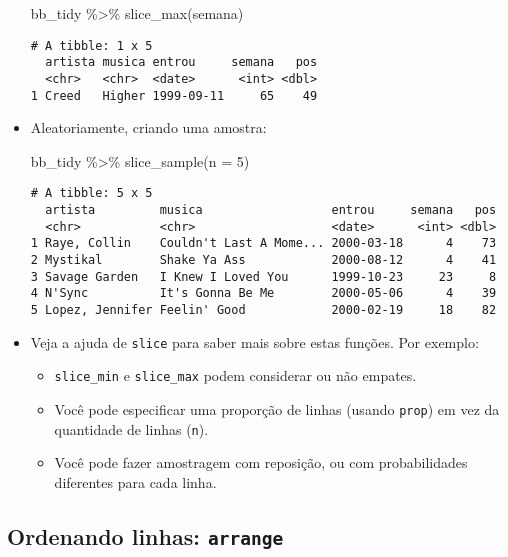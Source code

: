 \documentclass[
  letterpaper,
  DIV=11,
  numbers=noendperiod]{scrreprt}
\newenvironment{Shaded}{\begin{snugshade}}{\end{snugshade}}
\newcommand{\AttributeTok}[1]{\textcolor[rgb]{0.40,0.45,0.13}{#1}}
\newcommand{\DecValTok}[1]{\textcolor[rgb]{0.68,0.00,0.00}{#1}}
\newcommand{\FunctionTok}[1]{\textcolor[rgb]{0.28,0.35,0.67}{#1}}
\newcommand{\NormalTok}[1]{\textcolor[rgb]{0.00,0.23,0.31}{#1}}
\newcommand{\SpecialCharTok}[1]{\textcolor[rgb]{0.37,0.37,0.37}{#1}}
\begin{document}
\begin{itemize}
\begin{Shaded}
\begin{Highlighting}[]
\NormalTok{bb\_tidy }\SpecialCharTok{\%\textgreater{}\%} 
  \FunctionTok{slice\_max}\NormalTok{(semana)}
\end{Highlighting}
\end{Shaded}

\begin{verbatim}
# A tibble: 1 x 5
  artista musica entrou     semana   pos
  <chr>   <chr>  <date>      <int> <dbl>
1 Creed   Higher 1999-09-11     65    49
\end{verbatim}
\item
  Aleatoriamente, criando uma amostra:

\begin{Shaded}
\begin{Highlighting}[]
\NormalTok{bb\_tidy }\SpecialCharTok{\%\textgreater{}\%} 
  \FunctionTok{slice\_sample}\NormalTok{(}\AttributeTok{n =} \DecValTok{5}\NormalTok{)}
\end{Highlighting}
\end{Shaded}

\begin{verbatim}
# A tibble: 5 x 5
  artista         musica                  entrou     semana   pos
  <chr>           <chr>                   <date>      <int> <dbl>
1 Raye, Collin    Couldn't Last A Mome... 2000-03-18      4    73
2 Mystikal        Shake Ya Ass            2000-08-12      4    41
3 Savage Garden   I Knew I Loved You      1999-10-23     23     8
4 N'Sync          It's Gonna Be Me        2000-05-06      4    39
5 Lopez, Jennifer Feelin' Good            2000-02-19     18    82
\end{verbatim}
\item
  Veja a ajuda de \texttt{slice} para saber mais sobre estas funções.
  Por exemplo:

  \begin{itemize}
  \item
    \texttt{slice\_min} e \texttt{slice\_max} podem considerar ou não
    empates.
  \item
    Você pode especificar uma proporção de linhas (usando \texttt{prop})
    em vez da quantidade de linhas (\texttt{n}).
  \item
    Você pode fazer amostragem com reposição, ou com probabilidades
    diferentes para cada linha.
  \end{itemize}
\end{itemize}

\subsection{\texorpdfstring{Ordenando linhas:
\texttt{arrange}}{Ordenando linhas: arrange}}\label{ordenando-linhas-arrange}
\end{document}

